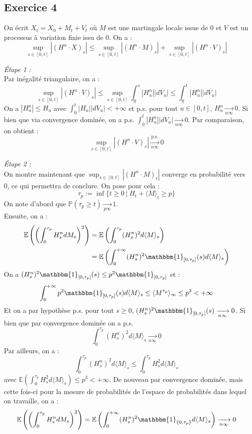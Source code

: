 \documentclass[a4paper,12pt]{article}
\newcommand{\E}{\mathbb{E}}
\newcommand{\prob}{\mathbb{P}}
\newcommand{\ind}{\mathbbm{1}}
\begin{document}
\subsection{Exercice 4}
On écrit $X_t=X_0+M_t+V_t$ où $M$ est une martingale locale issue de $0$ et $V$ est un processus à variation finie issu de $0$. On a :
$$\sup_{s \in [0,t]} |(H^n \cdot X)_s| \leq \sup_{s \in [0,t]} |(H^n \cdot M)_s| + \sup_{s \in [0,t]} |(H^n \cdot V)_s|$$

\textit{Étape 1 :} \\
Par inégalité triangulaire, on a :
$$\sup_{s \in [0,t]} |(H^n \cdot V)_s| \leq \sup_{s\in [0,t]} \int_0^s |H_u^n| | dV_u | \leq \int_0^t |H_u^n | |dV_u|$$
On a $|H_u^n| \leq H_u$ avec $\int_0^t |H_u| |dV_u| < + \infty$ et p.s. pour tout $u \in [0,t]$, $H_u^n \xrightarrow[n \infty]{} 0$. Si bien que via convergence dominée, on a p.s. $\int_0^t |H^n_u| |dV_u| \xrightarrow[n \infty]{} 0$. Par comparaison, on obtient :
$$\sup_{s \in [0,t]} |(H^n \cdot V)_s| \xrightarrow[n \infty]{\text{p.s.}} 0$$

\textit{Étape 2 :} \\
On montre maintenant que $\sup_{s \in [0,t]} |(H^n \cdot M)_t|$ converge en probabilité vers $0$, ce qui permettra de conclure. On pose pour cela :
$$\tau_p := \inf \{ t \geq 0 \ | \ H_t + \langle M \rangle_t \geq p \}$$
On note d'abord que $\prob( \tau_p \geq t) \xrightarrow[p \infty]{} 1$. \\

Ensuite, on a :
\begin{align*}
\E \left( \left( \int_0^{\tau_p} H_s^n dM_s \right)^2 \right) & = \E \left( \int_0^{\tau_p} (H_s^n)^2 d \langle M \rangle_s \right) \\
& = \E \left( \int_0^{+ \infty} (H_s^n)^2 \ind_{ [0, \tau_p] } (s) d \langle M \rangle_s \right)
\end{align*}
On a $(H_s^n)^2 \ind_{ [0, \tau_p] } (s) \leq p^2 \ind_{ [0, \tau_p] }$ et :
$$\int_0^{+\infty} p^2 \ind_{[0, \tau_p]} (s) d \langle M \rangle_s \leq \langle M^{\tau_p} \rangle_{\infty} \leq p^3 < + \infty$$
Et on a par hypothèse p.s. pour tout $s \geq 0$, $(H^n_s)^2 \ind_{ [0,\tau_p ] } (s) \xrightarrow[n \infty]{} 0$. Si bien que par convergence dominée on a p.s.
$$\int_0^{\tau_p} (H_s^n)^2 d \langle M \rangle_s \xrightarrow[n \infty]{} 0$$
Par ailleurs, on a :
$$\int_0^{\tau_p} (H_s^n)^2 d \langle M \rangle_s \leq \int_0^{\tau_p} H_s^2 d \langle M \rangle_s$$
avec $\E \left( \int_0^{\tau_p} H_s^2 d \langle M \rangle_s \right) \leq p^3 < + \infty$. De nouveau par convergence dominée, mais cette fois-ci pour la mesure de probabilités de l'espace de probabilités dans lequel on travaille, on a :
$$\E \left( \left( \int_0^{\tau_p} H_s^n dM_s \right)^2 \right) = \E \left( \int_0^{+\infty} (H_s^n)^2 \ind_{\{ 0, \tau_p \}} d \langle M \rangle_s \right) \xrightarrow[n \infty]{} 0$$
\end{document}
